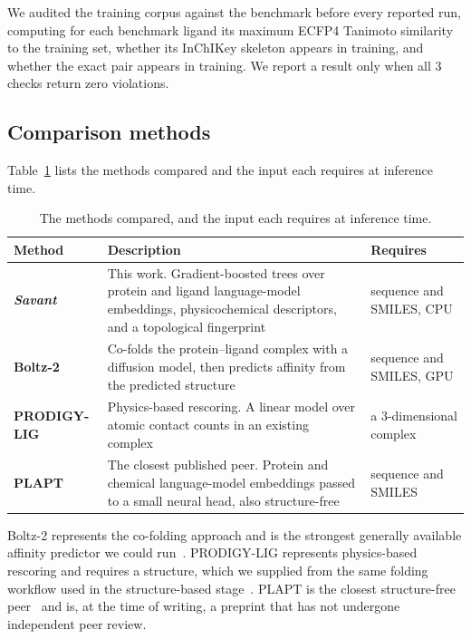 \documentclass[times, twoside]{zHenriquesLab-StyleBioRxiv}
\newcommand{\savant}{\textit{Savant}\xspace}
\newcommand{\pl}{protein--ligand\xspace}
\begin{document}
We audited the training corpus against the benchmark before every reported run, computing for each benchmark ligand its maximum ECFP4 Tanimoto similarity to the training set, whether its InChIKey skeleton appears in training, and whether the exact pair appears in training. We report a result only when all 3 checks return zero violations.

\subsection*{Comparison methods}

Table~\ref{tab:tools} lists the methods compared and the input each requires at inference time.

\begin{table}[h]
\centering
\caption{The methods compared, and the input each requires at inference time.}
\label{tab:tools}
\small
\begin{tabular}{p{}p{}p{}}
\toprule
Method & Description & Requires \\
\midrule
\textbf{\savant} & This work. Gradient-boosted trees over protein and ligand language-model embeddings, physicochemical descriptors, and a topological fingerprint & sequence and SMILES, CPU \\
\textbf{Boltz-2} & Co-folds the \pl complex with a diffusion model, then predicts affinity from the predicted structure & sequence and SMILES, GPU \\
\textbf{PRODIGY-LIG} & Physics-based rescoring. A linear model over atomic contact counts in an existing complex & a 3-dimensional complex \\
\textbf{PLAPT} & The closest published peer. Protein and chemical language-model embeddings passed to a small neural head, also structure-free & sequence and SMILES \\
\bottomrule
\end{tabular}
\end{table}

Boltz-2 represents the co-folding approach and is the strongest generally available affinity predictor we could run~\cite{passaro2025boltz2}. PRODIGY-LIG represents physics-based rescoring and requires a structure, which we supplied from the same folding workflow used in the structure-based stage~\cite{vangone2019prodigylig}. PLAPT is the closest structure-free peer~\cite{rose2024plapt} and is, at the time of writing, a preprint that has not undergone independent peer review.
\end{document}
